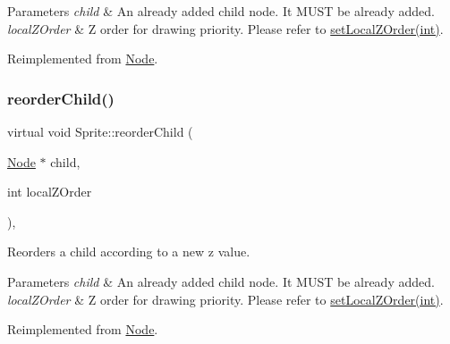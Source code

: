 \begin{DoxyParams}{Parameters}
{\em child} & An already added child node. It M\+U\+ST be already added. \\
\hline
{\em local\+Z\+Order} & Z order for drawing priority. Please refer to \hyperlink{classNode_aee4e616c2d55b722226aae1e68b4946f}{set\+Local\+Z\+Order(int)}. \\
\hline
\end{DoxyParams}


Reimplemented from \hyperlink{classNode_a5c9bc72e7f53c1e7f0ef6bc87c07a08f}{Node}.

\mbox{\label{classSprite_a1b21c65760769e17477ae02ce75adf9f}} 
\subsubsection{\texorpdfstring{reorder\+Child()}{reorderChild()}\hspace{0.1cm}{\footnotesize\ttfamily [2/2]}}
{\footnotesize\ttfamily virtual void Sprite\+::reorder\+Child (\begin{DoxyParamCaption}\item[{\hyperlink{classNode}{Node} $\ast$}]{child,  }\item[{int}]{local\+Z\+Order }\end{DoxyParamCaption})\hspace{0.3cm}{\ttfamily [override]}, {\ttfamily [virtual]}}

Reorders a child according to a new z value.


\begin{DoxyParams}{Parameters}
{\em child} & An already added child node. It M\+U\+ST be already added. \\
\hline
{\em local\+Z\+Order} & Z order for drawing priority. Please refer to \hyperlink{classNode_aee4e616c2d55b722226aae1e68b4946f}{set\+Local\+Z\+Order(int)}. \\
\hline
\end{DoxyParams}


Reimplemented from \hyperlink{classNode_a5c9bc72e7f53c1e7f0ef6bc87c07a08f}{Node}.

\mbox{\label{classSprite_ace1c8b1ba17bcf1086730e192b914a78}} 
